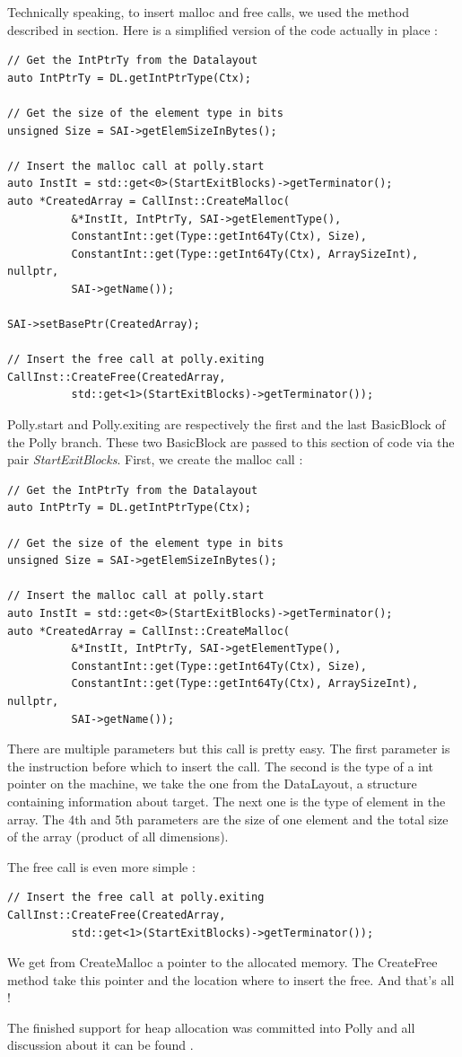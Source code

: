Technically speaking, to insert malloc and free calls, we used the method described in section. Here is a simplified version of the code actually in place :
\begin{lstlisting}[frame=single]
// Get the IntPtrTy from the Datalayout
auto IntPtrTy = DL.getIntPtrType(Ctx);

// Get the size of the element type in bits
unsigned Size = SAI->getElemSizeInBytes();

// Insert the malloc call at polly.start
auto InstIt = std::get<0>(StartExitBlocks)->getTerminator();
auto *CreatedArray = CallInst::CreateMalloc(
          &*InstIt, IntPtrTy, SAI->getElementType(),
          ConstantInt::get(Type::getInt64Ty(Ctx), Size),
          ConstantInt::get(Type::getInt64Ty(Ctx), ArraySizeInt), nullptr,
          SAI->getName());

SAI->setBasePtr(CreatedArray);

// Insert the free call at polly.exiting
CallInst::CreateFree(CreatedArray,
          std::get<1>(StartExitBlocks)->getTerminator());
\end{lstlisting}
Polly.start and Polly.exiting are respectively the first and the last BasicBlock of the Polly branch. These two BasicBlock are passed to this section of code via the pair \emph{StartExitBlocks}.
First, we create the malloc call :
\begin{lstlisting}[frame=single]
// Get the IntPtrTy from the Datalayout
auto IntPtrTy = DL.getIntPtrType(Ctx);

// Get the size of the element type in bits
unsigned Size = SAI->getElemSizeInBytes();

// Insert the malloc call at polly.start
auto InstIt = std::get<0>(StartExitBlocks)->getTerminator();
auto *CreatedArray = CallInst::CreateMalloc(
          &*InstIt, IntPtrTy, SAI->getElementType(),
          ConstantInt::get(Type::getInt64Ty(Ctx), Size),
          ConstantInt::get(Type::getInt64Ty(Ctx), ArraySizeInt), nullptr,
          SAI->getName());
\end{lstlisting}
There are multiple parameters but this call is pretty easy. The first parameter is the instruction before which to insert the call. The second is the type of a int pointer on the machine, we take the one from the DataLayout, a structure containing information about target. The next one is the type of element in the array. The 4th and 5th parameters are the size of one element and the total size of the array (product of all dimensions).

The free call is even more simple :
\begin{lstlisting}[frame=single]
// Insert the free call at polly.exiting
CallInst::CreateFree(CreatedArray,
          std::get<1>(StartExitBlocks)->getTerminator());
\end{lstlisting}
We get from CreateMalloc a pointer to the allocated memory. The CreateFree method take this pointer and the location where to insert the free. And that's all !

The finished support for heap allocation was committed into Polly and all discussion about it can be found .